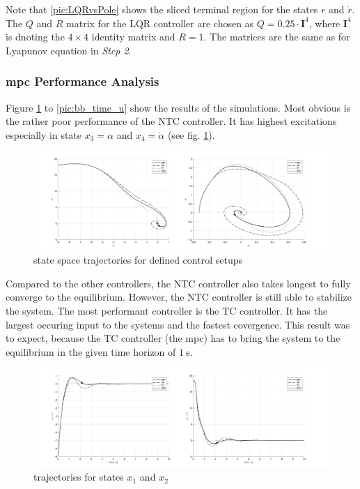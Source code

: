 \documentclass[10pt,a4paper]{article}
\begin{document}
Note that \ref{pic:LQRvsPole} shows the sliced terminal region for the states $r$ and $\dot{r}$. The $Q$ and $R$ matrix for the LQR controller are chosen
as $Q = 0.25 \cdot \mathbf{I}^4$, where $\mathbf{I}^4$ is dnoting the $4\times 4$ identity matrix and $R = 1$. The matrices are the same as for Lyapunov
equation in \textit{Step 2}.


\subsubsection*{\gls{mpc} Performance Analysis}
Figure \ref{pic:bb_state_space} to \ref{pic:bb_time_u} show the results of the simulations. Most obvious is the rather poor performance of the NTC controller.
It has highest excitations especially in state $x_3 = \alpha$ and $x_4 = \dot{\alpha}$ (see fig. \ref{pic:bb_state_space}).

\begin{figure}[h]
	\begin{center}
		\includegraphics[width=\textwidth]{img/bb_states.png}
		\caption{state space trajectories for defined control setups}
		\label{pic:bb_state_space}
	\end{center}
\end{figure}

Compared to the other controllers, the NTC controller also takes longest to fully converge to the equilibrium. However, the NTC controller is still able to
stabilize the system. The most performant controller is the TC controller. It has the largest occuring input to the systems  and the fastest covergence.
This result was to expect, because the TC controller (the \gls{mpc}) has to bring the system to the equilibrium in the given time horizon of $\SI{1}{\second}$. 

\begin{figure}[h]
	\begin{center}
		\includegraphics[width=\textwidth]{img/bb_time_x1x2.png}
		\caption{trajectories for states $x_1$ and $x_2$}
		\label{pic:bb_time_x1x2}
	\end{center}
\end{figure}
\end{document}
